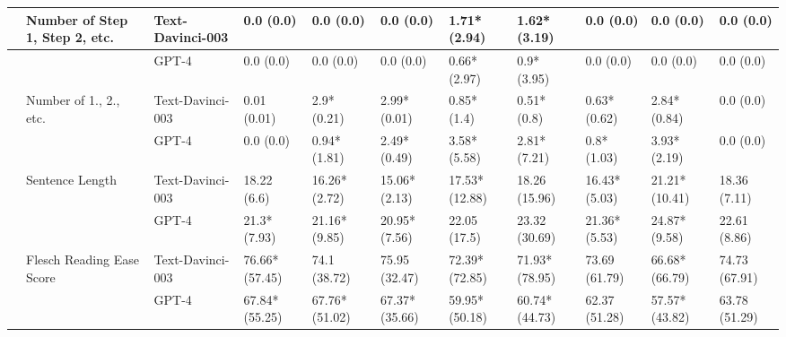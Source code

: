 \begin{tabular}{x{0.75cm}|x{1.5cm}|x{0.75cm}|x{0.75cm}|x{0.75cm}|x{0.75cm}|x{0.75cm}|x{0.75cm}|x{0.75cm}|x{0.75cm}|x{0.75cm}}
\hline
 & Number of Step 1, Step 2, etc. & Text-Davinci-003 & 0.0 (0.0) & 0.0 (0.0) & 0.0 (0.0) & 1.71* (2.94) & 1.62* (3.19) & 0.0 (0.0) & 0.0 (0.0) & 0.0 (0.0) \\
\hline
 &  & GPT-4 & 0.0 (0.0) & 0.0 (0.0) & 0.0 (0.0) & 0.66* (2.97) & 0.9* (3.95) & 0.0 (0.0) & 0.0 (0.0) & 0.0 (0.0) \\
\hline
 & Number of 1., 2., etc. & Text-Davinci-003 & 0.01 (0.01) & 2.9* (0.21) & 2.99* (0.01) & 0.85* (1.4) & 0.51* (0.8) & 0.63* (0.62) & 2.84* (0.84) & 0.0 (0.0) \\
\hline
 &  & GPT-4 & 0.0 (0.0) & 0.94* (1.81) & 2.49* (0.49) & 3.58* (5.58) & 2.81* (7.21) & 0.8* (1.03) & 3.93* (2.19) & 0.0 (0.0) \\
\hline
 & Sentence Length & Text-Davinci-003 & 18.22 (6.6) & 16.26* (2.72) & 15.06* (2.13) & 17.53* (12.88) & 18.26 (15.96) & 16.43* (5.03) & 21.21* (10.41) & 18.36 (7.11) \\
\hline
 &  & GPT-4 & 21.3* (7.93) & 21.16* (9.85) & 20.95* (7.56) & 22.05 (17.5) & 23.32 (30.69) & 21.36* (5.53) & 24.87* (9.58) & 22.61 (8.86) \\
\hline
 & Flesch Reading Ease Score & Text-Davinci-003 & 76.66* (57.45) & 74.1 (38.72) & 75.95 (32.47) & 72.39* (72.85) & 71.93* (78.95) & 73.69 (61.79) & 66.68* (66.79) & 74.73 (67.91) \\
\hline
 &  & GPT-4 & 67.84* (55.25) & 67.76* (51.02) & 67.37* (35.66) & 59.95* (50.18) & 60.74* (44.73) & 62.37 (51.28) & 57.57* (43.82) & 63.78 (51.29) \\
\hline
\bottomrule
\end{tabular}

